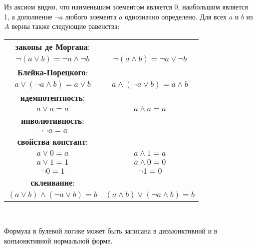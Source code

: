 Из аксиом видно, что наименьшим элементом является 0, наибольшим является 1, а дополнение $\neg a$ любого элемента $a$ однозначно определено. Для всех $a$ и $b$ из $A$ верны также следующие равенства: \\

\begin{center}
\addtolength{\tabcolsep}{12pt}
\begin{tabular}{c c}

\textbf{законы де Моргана}: & \\[4pt]
$\neg (a \lor b) = \neg a \land \neg b$ & $\neg (a \land b) = \neg a \lor \neg b$ \\[8pt]
\textbf{Блейка-Порецкого}: & \\[4pt]
$a \lor (\neg a \land b) = a \lor b$ & $a \land (\neg a \lor b) = a \land b$ \\[8pt]
\textbf{идемпотентность}: & \\[4pt]
$a \lor a = a$ & $a \land a = a$ \\[8pt]
\textbf{инволютивность}: & \\[4pt]
$\neg \neg a = a$ & \\[8pt]
\textbf{свойства констант}: & \\[4pt]
$a \lor 0 = a$ & $a \land 1 = a$ \\[8pt]
$a \lor 1 = 1$ & $a \land 0 = 0$ \\[8pt]
$\neg 0 = 1$ & $\neg 1 = 0$ \\[8pt]
\textbf{склеивание}: & \\[4pt]
$(a \lor b) \land (\neg a \lor b) = b$ & $(a \land b) \lor (\neg a \land b) = b$ \\[8pt]

\end{tabular}
\addtolength{\tabcolsep}{-12pt}
\end{center}
\

Формула в булевой логике может быть записана в дизъюнктивной и в конъюнктивной нормальной форме. \\

\

\

